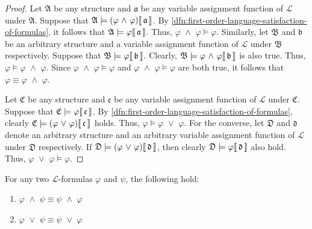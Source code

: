 \begin{proof}
    Let \( \mathfrak{A} \) be any structure and \( \mathfrak{a} \) be any variable assignment function of \( \mathcal{L} \) under \( \mathfrak{A} \).
    Suppose that \( \folwffsatisfaction{\mathfrak{A}}{\mleft( \varphi \,\,{\land}\,\, \varphi \mright)}{\mathfrak{a}} \).
    By \cref{dfn:first-order-language-satisfaction-of-formulas}, it follows that \(  \mathfrak{A} \models \varphi\llbracket\, \mathfrak{a} \,\rrbracket \).
    Thus, \( \varphi \,\,{\land}\,\, \varphi \models \varphi \).
    Similarly, let \( \mathfrak{B} \) and \( \mathfrak{b} \) be an arbitrary structure and a variable assignment function of \( \mathcal{L} \) under \( \mathfrak{B} \)
    respectively. Suppose that \(  \mathfrak{B} \models \varphi\llbracket\, \mathfrak{b} \,\rrbracket \).
    Clearly, \(  \mathfrak{B} \models \varphi \,\,{\land}\,\, \varphi\llbracket\, \mathfrak{b} \,\rrbracket \) is also true.
    Thus, \( \varphi \models \varphi \,\,{\land}\,\, \varphi \).
    Since \( \varphi \,\,{\land}\,\, \varphi \models \varphi \) and \( \varphi \,\,{\land}\,\, \varphi \models \varphi \) are both true,
    it follows that \( \varphi \equiv \varphi \,\,{\land}\,\, \varphi \).

    \vspace{0.3cm}
    \noindent
    Let \( \mathfrak{C} \) be any structure and \( \mathfrak{c} \) be any variable assignment function of \( \mathcal{L} \) under \( \mathfrak{C} \).
    Suppose that \(  \mathfrak{C} \models \varphi\llbracket\, \mathfrak{c} \,\rrbracket \). By \cref{dfn:first-order-language-satisfaction-of-formulas},
    clearly \( \folwffsatisfaction{\mathfrak{C}}{\mleft( \varphi \,\,{\lor}\,\, \varphi \mright)}{\mathfrak{c}} \) holds.
    Thus, \( \varphi \models \varphi \,\,{\lor}\,\, \varphi \).
    For the converse, let \( \mathfrak{D} \) and \( \mathfrak{d} \) denote an arbitrary structure and an arbitrary variable assignment function
    of \( \mathcal{L} \) under \( \mathfrak{D} \) respectively. If \( \folwffsatisfaction{\mathfrak{D}}{\mleft( \varphi \,\,{\lor}\,\, \varphi \mright)}{\mathfrak{d}} \),
    then clearly \(  \mathfrak{D} \models \varphi\llbracket\, \mathfrak{d} \,\rrbracket \) also hold.
    Thus, \( \varphi \,\,{\lor}\,\, \varphi \models \varphi \).
\end{proof}

\begin{thm}[Commutativity]
     \label{logical-equivalence:commutativity-of-conjunctions-and-disjunctions}
    For any two \( \mathcal{L} \)-formulas \( \varphi \) and \( \psi \), the following hold:
    \begin{enumerate}[topsep=2pt,label=\textup{\texttt{(\alph*)}}]
        \item \( \varphi \,\,{\land}\,\, \psi \equiv \psi \,\,{\land}\,\, \varphi \)
        \item \( \varphi \,\,{\lor}\,\, \psi \equiv \psi \,\,{\lor}\,\, \varphi \)
    \end{enumerate}
\end{thm}

